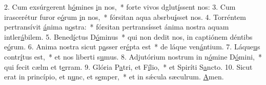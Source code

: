 2. Cum exsúrgerent h\uline{ó}mines \uline{i}n nos,~* forte vivos dglut\uline{í}ssent nos:
3. Cum irascerétur furor e\uline{ó}rum \uline{i}n nos,~* fórsitan aqua absrbu\uline{í}sset nos.
4. Torréntem pertransívit \uline{á}nima n\uline{o}stra:~* fórsitan pertransísset ánima nostra aquam intler\uline{á}bilem.
5. Bened\uline{í}ctus D\uline{ó}minus~* qui non dedit nos, in captiónem déntibs e\uline{ó}rum.
6. Anima nostra sicut p\uline{a}sser er\uline{é}pta est~* de láque ven\uline{á}ntium.
7. Láque\uline{u}s contr\uline{í}tus est,~* et nos liberti s\uline{u}mus.
8. Adjutórium nostrum in n\uline{ó}mine D\uline{ó}mini,~* qui fecit cælm et t\uline{e}rram.
9. Glória P\uline{a}tri, et F\uline{í}lio,~* et Spiríti S\uline{a}ncto.
10. Sicut erat in princípio, et n\uline{u}nc, et s\uline{e}mper,~* et in sǽcula sæculrum. \uline{A}men.
